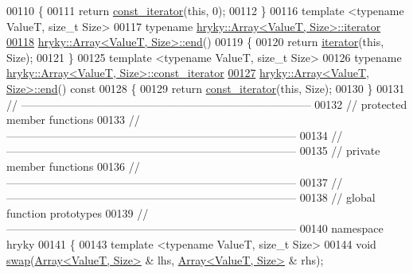 \begin{DoxyCode}
00110 \textcolor{keyword}{}\{
00111     \textcolor{keywordflow}{return} \hyperlink{classhryky_1_1iterator_1_1random_1_1_immutable}{const_iterator}(\textcolor{keyword}{this}, 0);
00112 \}
00116 \textcolor{keyword}{template} <\textcolor{keyword}{typename} ValueT, \textcolor{keywordtype}{size\_t} Size>
00117 \textcolor{keyword}{typename} \hyperlink{classhryky_1_1iterator_1_1random_1_1_mutable}{hryky::Array<ValueT, Size>::iterator}
\hypertarget{array_8h_source_l00118}{}\hyperlink{classhryky_1_1_array_a56e39a6620eeb368c9b237a82d7507bb}{00118} \hyperlink{classhryky_1_1_array_a56e39a6620eeb368c9b237a82d7507bb}{hryky::Array<ValueT, Size>::end}()
00119 \{
00120     \textcolor{keywordflow}{return} \hyperlink{classhryky_1_1iterator_1_1random_1_1_mutable}{iterator}(\textcolor{keyword}{this}, Size);
00121 \}
00125 \textcolor{keyword}{template} <\textcolor{keyword}{typename} ValueT, \textcolor{keywordtype}{size\_t} Size>
00126 \textcolor{keyword}{typename} \hyperlink{classhryky_1_1iterator_1_1random_1_1_immutable}{hryky::Array<ValueT, Size>::const_iterator}
\hypertarget{array_8h_source_l00127}{}\hyperlink{classhryky_1_1_array_a1aa3afc76c5f450c572fef4a3cf0254d}{00127} \hyperlink{classhryky_1_1_array_a56e39a6620eeb368c9b237a82d7507bb}{hryky::Array<ValueT, Size>::end}()\textcolor{keyword}{ const}
00128 \textcolor{keyword}{}\{
00129     \textcolor{keywordflow}{return} \hyperlink{classhryky_1_1iterator_1_1random_1_1_immutable}{const_iterator}(\textcolor{keyword}{this}, Size);
00130 \}
00131 \textcolor{comment}{//
      ------------------------------------------------------------------------------}
00132 \textcolor{comment}{// protected member functions}
00133 \textcolor{comment}{//
      ------------------------------------------------------------------------------}
00134 \textcolor{comment}{//
      ------------------------------------------------------------------------------}
00135 \textcolor{comment}{// private member functions}
00136 \textcolor{comment}{//
      ------------------------------------------------------------------------------}
00137 \textcolor{comment}{//
      ------------------------------------------------------------------------------}
00138 \textcolor{comment}{// global function prototypes}
00139 \textcolor{comment}{//
      ------------------------------------------------------------------------------}
00140 \textcolor{keyword}{namespace }hryky
00141 \{
00143     \textcolor{keyword}{template} <\textcolor{keyword}{typename} ValueT, \textcolor{keywordtype}{size\_t} Size>
00144     \textcolor{keywordtype}{void} \hyperlink{namespacehryky_a4282146df5ea2b68cb667896a2205909}{swap}(\hyperlink{classhryky_1_1_array}{Array<ValueT, Size>} & lhs, \hyperlink{classhryky_1_1_array}{Array<ValueT, Size>} & rhs);

\end{DoxyCode}
